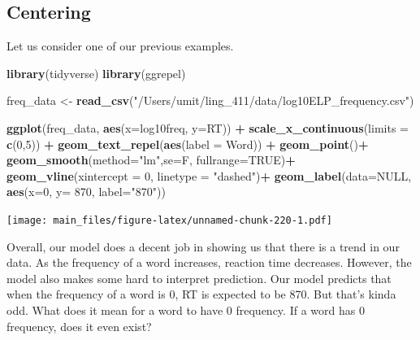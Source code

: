 \documentclass[
]{book}
\newenvironment{Shaded}{\begin{snugshade}}{\end{snugshade}}
\newcommand{\AttributeTok}[1]{\textcolor[rgb]{0.13,0.29,0.53}{#1}}
\newcommand{\ConstantTok}[1]{\textcolor[rgb]{0.56,0.35,0.01}{#1}}
\newcommand{\DecValTok}[1]{\textcolor[rgb]{0.00,0.00,0.81}{#1}}
\newcommand{\FunctionTok}[1]{\textcolor[rgb]{0.13,0.29,0.53}{\textbf{#1}}}
\newcommand{\NormalTok}[1]{#1}
\newcommand{\OtherTok}[1]{\textcolor[rgb]{0.56,0.35,0.01}{#1}}
\newcommand{\SpecialCharTok}[1]{\textcolor[rgb]{0.81,0.36,0.00}{\textbf{#1}}}
\newcommand{\StringTok}[1]{\textcolor[rgb]{0.31,0.60,0.02}{#1}}
\begin{document}
\hypertarget{centering}{%
\subsection{Centering}\label{centering}}

Let us consider one of our previous examples.

\begin{Shaded}
\begin{Highlighting}[]
\FunctionTok{library}\NormalTok{(tidyverse)}
\FunctionTok{library}\NormalTok{(ggrepel)}
\end{Highlighting}
\end{Shaded}

\begin{Shaded}
\begin{Highlighting}[]
\NormalTok{freq\_data }\OtherTok{\textless{}{-}} \FunctionTok{read\_csv}\NormalTok{(}\StringTok{"/Users/umit/ling\_411/data/log10ELP\_frequency.csv"}\NormalTok{)}

\FunctionTok{ggplot}\NormalTok{(freq\_data, }\FunctionTok{aes}\NormalTok{(}\AttributeTok{x=}\NormalTok{log10freq, }\AttributeTok{y=}\NormalTok{RT)) }\SpecialCharTok{+}
  \FunctionTok{scale\_x\_continuous}\NormalTok{(}\AttributeTok{limits =} \FunctionTok{c}\NormalTok{(}\DecValTok{0}\NormalTok{,}\DecValTok{5}\NormalTok{)) }\SpecialCharTok{+}
  \FunctionTok{geom\_text\_repel}\NormalTok{(}\FunctionTok{aes}\NormalTok{(}\AttributeTok{label =}\NormalTok{ Word)) }\SpecialCharTok{+}
  \FunctionTok{geom\_point}\NormalTok{()}\SpecialCharTok{+}
  \FunctionTok{geom\_smooth}\NormalTok{(}\AttributeTok{method=}\StringTok{"lm"}\NormalTok{,}\AttributeTok{se=}\NormalTok{F, }\AttributeTok{fullrange=}\ConstantTok{TRUE}\NormalTok{)}\SpecialCharTok{+}
  \FunctionTok{geom\_vline}\NormalTok{(}\AttributeTok{xintercept =} \DecValTok{0}\NormalTok{, }\AttributeTok{linetype =} \StringTok{"dashed"}\NormalTok{)}\SpecialCharTok{+}
  \FunctionTok{geom\_label}\NormalTok{(}\AttributeTok{data=}\ConstantTok{NULL}\NormalTok{, }\FunctionTok{aes}\NormalTok{(}\AttributeTok{x=}\DecValTok{0}\NormalTok{, }\AttributeTok{y=} \DecValTok{870}\NormalTok{, }\AttributeTok{label=}\StringTok{"870"}\NormalTok{))}
\end{Highlighting}
\end{Shaded}

\texttt{[image: main\_files/figure-latex/unnamed-chunk-220-1.pdf]}

Overall, our model does a decent job in showing us that there is a trend in our data. As the frequency of a word increases, reaction time decreases. However, the model also makes some hard to interpret prediction. Our model predicts that when the frequency of a word is 0, RT is expected to be 870. But that's kinda odd. What does it mean for a word to have 0 frequency. If a word has 0 frequency, does it even exist?
\end{document}

